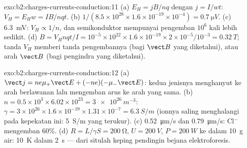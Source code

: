 \begin{solution}{exo:b2:charges-currents-conduction:11}
(a) $E_H = jB/nq$ dengan $j = I/wt$: $V_H = E_Hw = IB/nqt$. (b) $1/(8.5 \times 10^{28}
\times 1.6 \times 10^{-19} \times 10^{-4}) = \qty{0.7}{\micro V}$. (c) \qty{6.3}{mV}: $V_H \propto 1/n$,
dan semikonduktor mempunyai pengemban $10^6$ kali lebih sedikit. (d) $B = V_Hnqt/I =
10^{-5} \times 10^{22} \times 1.6 \times 10^{-19} \times 2 \times 10^{-5}/10^{-3} = \qty{0.32}{T}$; tanda
$V_H$ memberi tanda pengembannya (bagi $\vect B$ yang diketahui), atau
arah $\vect B$ (bagi pengindra yang diketahui).
\end{solution}

\begin{solution}{exo:b2:charges-currents-conduction:12}
(a) $\vect j = ne\mu_+\vect E + (-ne)(-\mu_-\vect E)$: kedua jenisnya menghanyut ke
arah berlawanan lalu mengemban arus ke arah yang sama. (b) $n =
0.5 \times 10^3 \times 6.02 \times 10^{23} = \qty{3e26}{m^{-3}}$: $\gamma = 3 \times 10^{26} \times 1.6 \times 10^{-19}
\times 1.31 \times 10^{-7} = \qty{6.3}{S/m}$ (ionnya saling menghalangi pada
kepekatan ini: \qty{5}{S/m} yang terukur). (c) \qty{0.52}{\micro m/s} dan \qty{0.79}{\micro m/s}:
Cl$^-$ mengemban $60\%$. (d) $R = L/\gamma S = \qty{200}{\ohm}$, $U = \qty{200}{V}$, $P =
\qty{200}{W}$ ke dalam \qty{10}{g} air: \qty{10}{K} dalam \qty{2}{s} --- dari situlah keping
pendingin bejana elektroforesis.
\end{solution}

